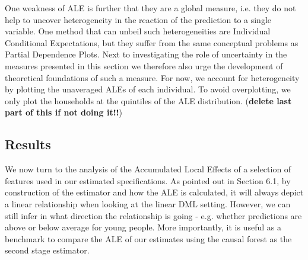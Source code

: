 One weakness of ALE is further that they are a global measure, i.e. they do not help to uncover heterogeneity in the reaction of the prediction to a single variable. One method that can unbeil such heterogeneities are Individual Conditional Expectations, but they suffer from the same conceptual problems as Partial Dependence Plots. Next to investigating the role of uncertainty in the measures presented in this section we therefore also urge the development of theoretical foundations of such a measure. For now, we account for heterogeneity by plotting the unaveraged ALEs of each individual. To avoid overplotting, we only plot the households at the quintiles of the ALE distribution. (\textbf{delete last part of this if not doing it!!})

\subsection{Results}
We now turn to the analysis of the Accumulated Local Effects of a selection of features used in our estimated specifications. As pointed out in Section 6.1, by construction of the estimator and how the ALE is calculated, it will always depict a linear relationship when looking at the linear DML setting. However, we can still infer in what direction the relationship is going - e.g. whether predictions are above or below average for young people. More importantly, it is useful as a benchmark to compare the ALE of our estimates using the causal forest as the second stage estimator. \\
